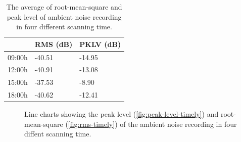 	\begin{table}[h]
	\centering
	\caption{The average of root-mean-square and peak level of ambient noise recording in four different scanning time.}
	\label{tab:ambient-noise-timely}
	\begin{tabular}{lll}
	\toprule
	       & \ac{RMS} (dB) & \ac{PKLV} (dB) \\ \midrule
	09:00h & -40.51        & -14.95          \\
	12:00h & -40.91        & -13.08          \\
	15:00h & -37.53        & -8.90           \\
	18:00h & -40.62        & -12.41          \\ \bottomrule
	\end{tabular}
	\end{table}

	\begin{figure}[h]
		\begin{adjustwidth}{-1cm}{}
		\caption[Ambient noise in different scanning time.]
		{Line charts showing the peak level (\ref{fig:peak-level-timely}) and root-mean-square (\ref{fig:rms-timely}) of the ambient noise recording in four diffent scanning time.}
		\label{fig:audio-result-timely}
		\end{adjustwidth}
	\end{figure}



